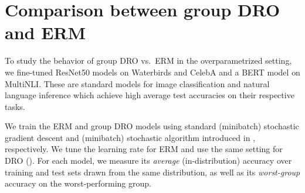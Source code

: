 \section{Comparison between group DRO and ERM}\label{sec:experiments}
To study the behavior of group DRO vs.~ERM in the overparametrized setting,
we fine-tuned ResNet50 models \citep{he2016resnet} on Waterbirds and CelebA
and a BERT model \citep{devlin2019bert} on MultiNLI.
These are standard models for image classification and natural language inference which achieve high average test accuracies on their respective tasks.

We train the ERM  and group DRO  models using standard (minibatch) stochastic gradient descent and (minibatch) stochastic algorithm introduced in , respectively.
We tune the learning rate for ERM and use the same setting for DRO
().
For each model, we measure its \emph{average} (in-distribution) accuracy over
training and test sets drawn from the same distribution,
as well as its \emph{worst-group} accuracy on the worst-performing group.
